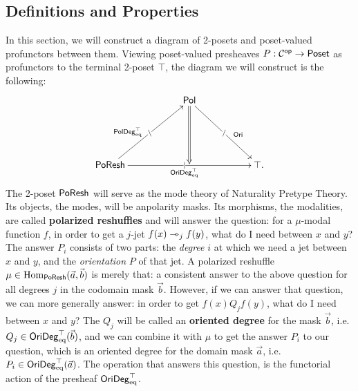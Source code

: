 \documentclass[a4paper]{memoir}
\begin{document}
\subsection{Definitions and Properties} \label{sec:poreshcat:def}
In this section, we will construct a diagram of 2-posets and poset-valued profunctors between them.
Viewing poset-valued presheaves $P : {\mathcal{C}}^{\mathsf{op}} \to {\mathsf{Poset}}$ as profunctors to the terminal 2-poset $\top$, the diagram we will construct is the following:
\[
	\xymatrix{
		&& \polcat
			\ar[rrdd]|{/}^(.6){\oripsh}
			\ar@{=>}[dd]
		\\ \\
		\poreshcat
			\ar[rruu]|{\setminus}^(.4){\poldegeqtop}
			\ar[rrrr]|{|}_{\oridegeqtop}
		&&&&
		\top.
	}
\]
The 2-poset $\mathsf{PoResh}$ will serve as the mode theory of Naturality Pretype Theory.
Its objects, the modes, will be anpolarity masks.
Its morphisms, the modalities, are called \textbf{polarized reshuffles} and will answer the question: for a $\mu$-modal function $f$, in order to get a $j$-jet $f(x) \rightarrowtriangle_j f(y)$, what do I need between $x$ and $y$?
The answer $P_i$ consists of two parts: the \emph{degree} $i$ at which we need a jet between $x$ and $y$, and the \emph{orientation} $P$ of that jet.
A polarized reshuffle $\mu \in {\mathrm{Hom}}_{\mathsf{PoResh}}(\vec a, \vec b)$ is merely that: a consistent answer to the above question for all degrees $j$ in the codomain mask $\vec b$.
However, if we can answer that question, we can more generally answer: in order to get $f(x) \mathrel{Q_j} f(y)$, what do I need between $x$ and $y$?
The $Q_j$ will be called an \textbf{oriented degree} for the mask $\vec b$, i.e. $Q_j \in \mathsf{OriDeg}_{\mathrm{eq}}^\top(\vec b)$, and we can combine it with $\mu$ to get the answer $P_i$ to our question, which is an oriented degree for the domain mask $\vec a$, i.e.\ $P_i \in \mathsf{OriDeg}_{\mathrm{eq}}^\top(\vec a)$.
The operation that answers this question, is the functorial action of the presheaf $\mathsf{OriDeg}_{\mathrm{eq}}^\top$.
\end{document}
